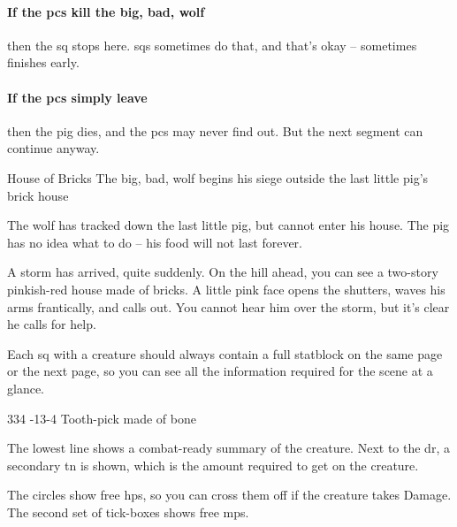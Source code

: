 \begin{multicols}{2}
\paragraph{If the \glspl{pc} kill the big, bad, wolf}
then the \gls{sq} stops here.
\Glspl{sq} sometimes do that, and that's okay -- sometimes  finishes early.

\paragraph{If the \glspl{pc} simply leave}
then the pig dies, and the \glspl{pc} may never find out.
But the next \gls{segment} can continue anyway.

{House of Bricks}%
{The big, bad, wolf begins his siege outside the last little pig's brick house}%

\begin{exampletext}
  The wolf has tracked down the last little pig, but cannot enter his house.
  The pig has no idea what to do -- his food will not last forever.
\end{exampletext}

\begin{boxtext}
  A storm has arrived, quite suddenly.
  On the hill ahead, you can see a two-story pinkish-red house made of bricks.
  A little pink face opens the shutters, waves his arms frantically, and calls out.
  You cannot hear him over the storm, but it's clear he calls for help.
\end{boxtext}

Each \gls{sq} with a creature should always contain a full statblock on the same page or the next page, so you can see all the information required for the scene at a glance.

%
  {{3}{3}{4}}%
  {{-1}{3}{-4}}%
  {%
  }%
  {}%
  {Tooth-pick made of bone}%
  {\quadraped {}}%

\vspace{2em}
The lowest line shows a combat-ready summary of the creature.
Next to the \gls{dr}, a secondary \gls{tn} is shown, which is the amount required to get  on the creature.

The circles show free \glspl{hp}, so you can cross them off if the creature takes Damage.
The second set of tick-boxes shows free \glspl{mp}.


\end{multicols}
